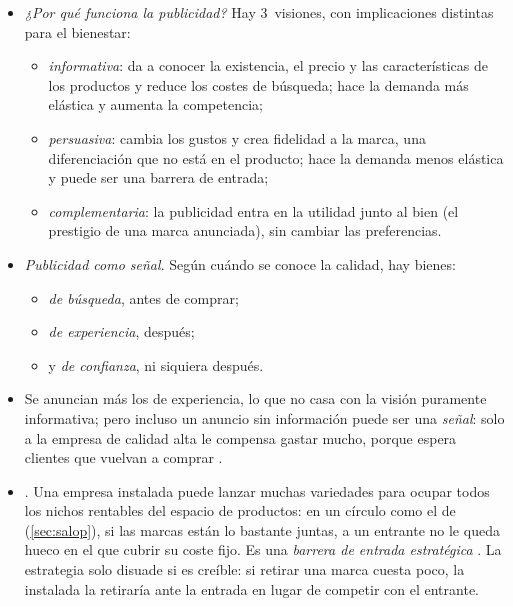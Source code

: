 \documentclass[11pt]{article}
\begin{document}
\begin{itemize}
\item \emph{¿Por qué funciona la publicidad?} Hay 3~visiones, con implicaciones distintas para el bienestar\nocite{Bagwell2007Economic}:
  \begin{itemize}
  \item \emph{informativa}: da a conocer la existencia, el precio y las características de los productos y reduce los costes de búsqueda; hace la demanda más elástica y aumenta la competencia\nocite{Nelson1974Advertising};
  \item \emph{persuasiva}: cambia los gustos y crea fidelidad a la marca, una diferenciación que no está en el producto; hace la demanda menos elástica y puede ser una barrera de entrada;
  \item \emph{complementaria}: la publicidad entra en la utilidad junto al bien (el prestigio de una marca anunciada), sin cambiar las preferencias\nocite{BeckerMurphy1993Simple}.
  \end{itemize}
\item \emph{Publicidad como señal}. Según cuándo se conoce la calidad, hay bienes:
  \begin{itemize}
  \item \emph{de búsqueda}, antes de comprar;
  \item \emph{de experiencia}, después\nocite{Nelson1970Information};
  \item y \emph{de confianza}, ni siquiera después\nocite{DarbyKarni1973Free}.
  \end{itemize}
\item Se anuncian más los de experiencia, lo que no casa con la visión puramente informativa; pero incluso un anuncio sin información puede ser una \emph{señal}: solo a la empresa de calidad alta le compensa gastar mucho, porque espera clientes que vuelvan a comprar\nocite{Nelson1974Advertising,MilgromRoberts1986Price} .
\item {}. Una empresa instalada puede lanzar muchas variedades para ocupar todos los nichos rentables del espacio de productos: en un círculo como el de  (\ref{sec:salop}), si las marcas están lo bastante juntas, a un entrante no le queda hueco en el que cubrir su coste fijo. Es una \emph{barrera de entrada estratégica} . La estrategia solo disuade si es creíble: si retirar una marca cuesta poco, la instalada la retiraría ante la entrada en lugar de competir con el entrante\nocite{Judd1985Credible}.
\end{itemize}
\end{document}
